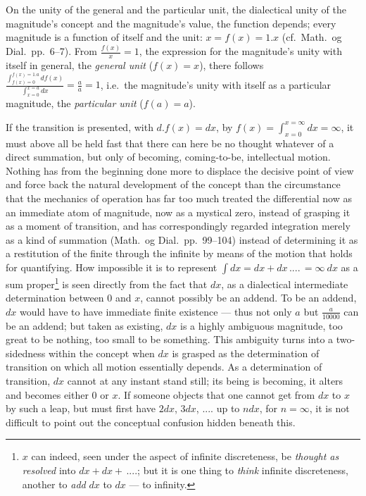 \documentclass[12pt,a4paper]{book}
\begin{document}
On the unity of the general and the particular unit, the dialectical unity of
the magnitude's concept and the magnitude's value, the function depends; every
magnitude is a function of itself and the unit: $x = f(x) =
1. x$ (cf.\ Math.\ og Dial.\ pp.~6--7). From $\frac{f(x)}{x} = 1$, the
expression for the magnitude's unity with itself in general, the
\emph{general unit} ($f(x) = x$), there follows
$\frac{\int_{f(x)=0}^{f(x)=1.a} df(x)}{\int_{x=0}^{x=a} dx} =
\frac{a}{a} = 1$, i.e.\ the magnitude's unity with itself as a particular
magnitude, the \emph{particular unit} ($f(a) = a$).

If the transition is presented, with $d.f(x) = dx$, by $f(x) =
\int_{x=0}^{x=\infty} dx = \infty$, it must above all be held fast that there
can here be no thought whatever of a direct summation, but only of becoming,
coming-to-be, intellectual motion. Nothing has from the beginning done more to
displace the decisive point of view and force back the natural development of
the concept than the circumstance that the mechanics of operation has far too
much treated the differential now as an immediate atom of magnitude, now as a
mystical zero, instead of grasping it
\setcounter{footnote}{0}
as a moment of transition, and has correspondingly regarded integration merely
as a kind of summation (Math.\ og Dial.\ pp.~99--104) instead of determining it
as a restitution of the finite through the infinite by means of the motion that
holds for quantifying. How impossible it is to represent
$\int dx = dx + dx\,....\,= \infty\ dx$ as a sum proper\footnote{$x$ can indeed,
seen under the aspect of infinite discreteness, be \emph{thought as resolved}
into $dx + dx +\,....$; but it is one thing to \emph{think} infinite
discreteness, another to \emph{add} $dx$ to $dx$ --- to infinity.} is seen
directly from the fact that $dx$, as a dialectical intermediate determination
between $0$ and $x$, cannot possibly be an addend. To be an addend, $dx$ would
have to have immediate finite existence --- thus not only $a$ but
$\frac{a}{10000}$ can be an addend; but taken as existing, $dx$ is a highly
ambiguous magnitude, too great to be nothing, too small to be something. This
ambiguity turns into a two-sidedness within the concept when $dx$ is grasped as
the determination of transition on which all motion essentially depends. As a
determination of transition, $dx$ cannot at any instant stand still; its being
is becoming, it alters and becomes either $0$ or $x$. If someone objects that
one cannot get from $dx$ to $x$ by such a leap, but must first have $2dx$,
$3dx$, $....$ up to $ndx$, for $n = \infty$, it is not difficult to point out
the conceptual confusion hidden beneath this.
\end{document}
